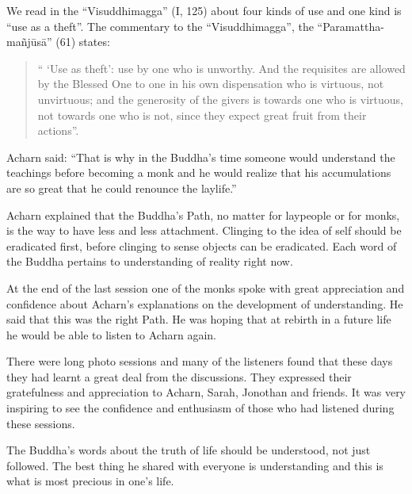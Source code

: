We read in the ``Visuddhimagga'' (I, 125) about four kinds of use and
one kind is ``use as a theft''. The commentary to the ``Visuddhimagga'',
the ``Paramattha-mañjūsā'' (61) states:
\begin{quote}
    

`` `Use as theft': use by one who is unworthy. And the requisites are
allowed by the Blessed One to one in his own dispensation who is
virtuous, not unvirtuous; and the generosity of the givers is towards
one who is virtuous, not towards one who is not, since they expect great
fruit from their actions''.
\end{quote}
Acharn said: ``That is why in the Buddha's time someone would understand
the teachings before becoming a monk and he would realize that his
accumulations are so great that he could renounce the laylife.''

Acharn explained that the Buddha's Path, no matter for laypeople or for
monks, is the way to have less and less attachment. Clinging to the idea
of self should be eradicated first, before clinging to sense objects can
be eradicated. Each word of the Buddha pertains to understanding of
reality right now.

At the end of the last session one of the monks spoke with great
appreciation and confidence about Acharn's explanations on the
development of understanding. He said that this was the right Path. He
was hoping that at rebirth in a future life he would be able to listen
to Acharn again.

There were long photo sessions and many of the listeners found that
these days they had learnt a great deal from the discussions. They
expressed their gratefulness and appreciation to Acharn, Sarah, Jonothan
and friends. It was very inspiring to see the confidence and enthusiasm
of those who had listened during these sessions.

The Buddha's words about the truth of life should be understood, not
just followed. The best thing he shared with everyone is understanding
and this is what is most precious in one's life.

